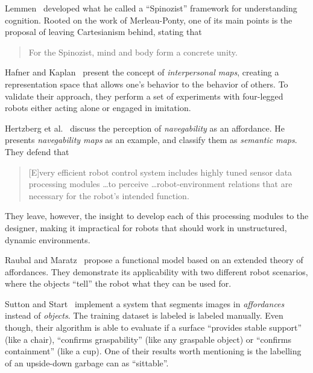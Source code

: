 \documentclass{article}
\begin{document}
Lemmen~\cite{lemmen1997} developed what he called a ``Spinozist'' framework for
understanding cognition. Rooted on the work of Merleau-Ponty, one of its main
points is the proposal of leaving Cartesianism behind, stating that

\begin{quotation}
  For the Spinozist, mind and body form a concrete unity.
\end{quotation}


Hafner and Kaplan~\cite{hafner2008} present the concept of \emph{interpersonal
maps}, creating a representation space that allows one's behavior to the
behavior of others. To validate their approach, they perform a set of
experiments with four-legged robots either acting alone or engaged in imitation.

Hertzberg et al.~\cite{hertzberg2008} discuss the perception of
\emph{navegability} as an affordance. He presents \emph{navegability maps} as an
example, and classify them as \emph{semantic maps}. They defend that

\begin{quotation}
  [E]very efficient robot control system includes highly tuned sensor data
  processing modules \dots to perceive \dots robot-environment relations that
  are necessary for the robot's intended function.
\end{quotation}

They leave, however, the insight to develop each of this processing modules to
the designer, making it impractical for robots that should work in unstructured,
dynamic environments.

Raubal and Maratz~\cite{raubal2008} propose a functional model based on an
extended theory of affordances. They demonstrate its applicability with two
different robot scenarios, where the objects ``tell'' the robot what they can be
used for. 

Sutton and Start~\cite{sutton2008} implement a system that segments images in
\emph{affordances} instead of \emph{objects}. The training dataset is labeled is
labeled manually. Even though, their algorithm is able to evaluate if a surface
``provides stable support'' (like a chair), ``confirms graspability'' (like any
graspable object) or ``confirms containment'' (like a cup). One of their results
worth mentioning is the labelling of an upside-down garbage can as ``sittable''.
\end{document}
